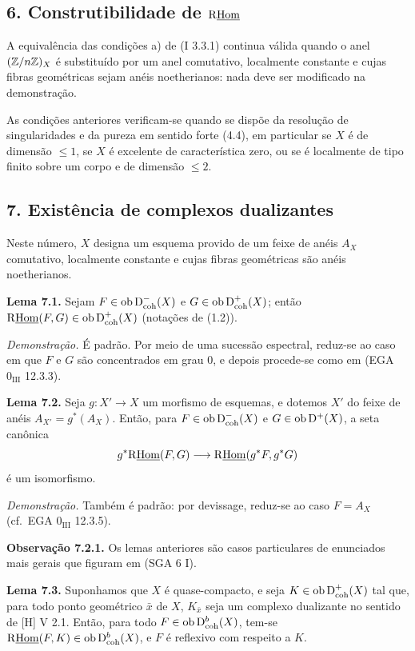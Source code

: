 \subsection*{6. Construtibilidade de $\mathrm{R}\underline{\operatorname{Hom}}$}

A equivalência das condições a) de (I 3.3.1) continua válida quando o anel $(\mathbb{Z}/n\mathbb{Z})_X$ é substituído por um anel comutativo, localmente constante e cujas fibras geométricas sejam anéis noetherianos: nada deve ser modificado na demonstração.

As condições anteriores verificam-se quando se dispõe da resolução de singularidades e da pureza em sentido forte (4.4), em particular se $X$ é de dimensão $\leq1$, se $X$ é excelente de característica zero, ou se é localmente de tipo finito sobre um corpo e de dimensão $\leq2$.

\subsection*{7. Existência de complexos dualizantes}

Neste número, $X$ designa um esquema provido de um feixe de anéis $A_X$ comutativo, localmente constante e cujas fibras geométricas são anéis noetherianos.

\textbf{Lema 7.1.} Sejam $F\in\operatorname{ob}\mathrm{D}^{-}_{\mathrm{coh}}(X)$ e $G\in\operatorname{ob}\mathrm{D}^{+}_{\mathrm{coh}}(X)$; então $\mathrm{R}\underline{\operatorname{Hom}}(F,G)\in\operatorname{ob}\mathrm{D}^{+}_{\mathrm{coh}}(X)$ (notações de (1.2)).

\emph{Demonstração.} É padrão. Por meio de uma sucessão espectral, reduz-se ao caso em que $F$ e $G$ são concentrados em grau $0$, e depois procede-se como em (EGA $0_{\mathrm{III}}$ 12.3.3).

\textbf{Lema 7.2.} Seja $g:X'\to X$ um morfismo de esquemas, e dotemos $X'$ do feixe de anéis $A_{X'}=g^*(A_X)$. Então, para $F\in\operatorname{ob}\mathrm{D}^{-}_{\mathrm{coh}}(X)$ e $G\in\operatorname{ob}\mathrm{D}^{+}(X)$, a seta canônica
\[
        g^*\mathrm{R}\underline{\operatorname{Hom}}(F,G)\longrightarrow \mathrm{R}\underline{\operatorname{Hom}}(g^*F,g^*G)
\]
é um isomorfismo.

\emph{Demonstração.} Também é padrão: por devissage, reduz-se ao caso $F=A_X$ (cf.~EGA $0_{\mathrm{III}}$ 12.3.5).

\textbf{Observação 7.2.1.} Os lemas anteriores são casos particulares de enunciados mais gerais que figuram em (SGA 6 I).

\textbf{Lema 7.3.} Suponhamos que $X$ é quase-compacto, e seja $K\in\operatorname{ob}\mathrm{D}^{+}_{\mathrm{coh}}(X)$ tal que, para todo ponto geométrico $\bar{x}$ de $X$, $K_{\bar{x}}$ seja um complexo dualizante no sentido de [H] V 2.1. Então, para todo $F\in\operatorname{ob}\mathrm{D}^{b}_{\mathrm{coh}}(X)$, tem-se $\mathrm{R}\underline{\operatorname{Hom}}(F,K)\in\operatorname{ob}\mathrm{D}^{b}_{\mathrm{coh}}(X)$, e $F$ é reflexivo com respeito a $K$.

